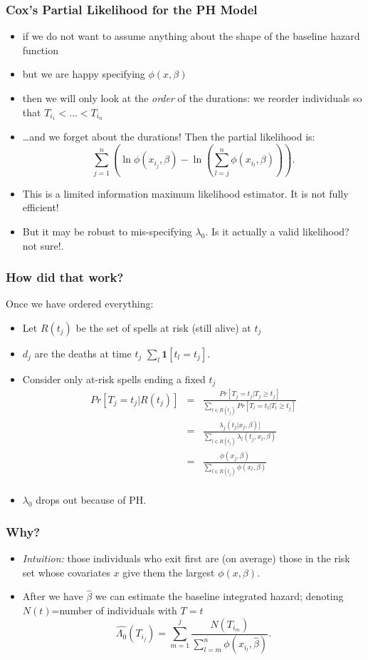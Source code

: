 \documentclass[aspectratio=169]{beamer}
\begin{document}
\begin{frame}
\frametitle{Cox's Partial Likelihood for the PH Model}
\begin{itemize}
\item if we do not want to assume anything about the shape of the \alert{baseline hazard function}
\item but we are happy specifying $\phi(x,\beta)$
\item then we will only look at the {\em order\/} of the durations: we
reorder individuals so that $T_{i_1}<\ldots<T_{i_n}$
\item \ldots and we forget about the durations! Then the partial
likelihood is:
\[
\sum_{j=1}^n
\left(
 \ln \phi(x_{i_j},\beta)
  -\ln
  \left(
  \sum_{l=j}^n
\phi(x_{i_l},\beta)
\right)
\right).
\]
\item This is a \alert{limited information maximum likelihood estimator}. It is not fully efficient!
\item But it may be robust to mis-specifying $\lambda_0$.  Is it actually a valid likelihood? \alert{not sure!}.
\end{itemize}
\end{frame}

\begin{frame}
\frametitle{How did that work?}
Once we have ordered everything:
\begin{itemize}
\item Let $R(t_j)$ be the set of spells at risk (still alive) at $t_j$
\item $d_j$ are the deaths at time $t_j$ $\sum_l \mathbf{1}[t_l = t_j]$.
\item Consider only at-risk spells ending a fixed $t_j$
\begin{eqnarray*}
Pr[T_j = t_j \vert R(t_j)] &=& \frac{Pr[T_j = t_j \vert T_j \geq t_j]}{\sum_{l \in R(t_j)} Pr[T_l = t_l \vert T_l \geq t_j]}\\
 &=& \frac{\lambda_j(t_j | x_j, \beta) ]}{\sum_{l \in R(t_j)} \lambda_l (t_j,x_l,\beta)}\\
 &=& \frac{\phi( x_j, \beta) }{\sum_{l \in R(t_j)} \phi (x_l,\beta)}\\
\end{eqnarray*}
\item $\lambda_0$ drops out because of PH.
\end{itemize}
\end{frame}

\begin{frame} 
\frametitle{Why?}
\begin{itemize}
\item \emph{Intuition:\/} those individuals who exit first are (on average) those in
the risk set whose covariates $x$ give them the largest $\phi(x,\beta)$.
\item After we have $\hat{\beta}$ we can estimate the baseline integrated
hazard; denoting $N(t)$=number of individuals with $T=t$
\[
\widehat{\Lambda_0}(T_{i_j})=\sum_{m=1}^j \frac{N(T_{i_m})}{\sum_{l=m}^n
\phi(x_{i_l},\hat{\beta})}.
\]
\end{itemize}
\end{frame}
\end{document}
